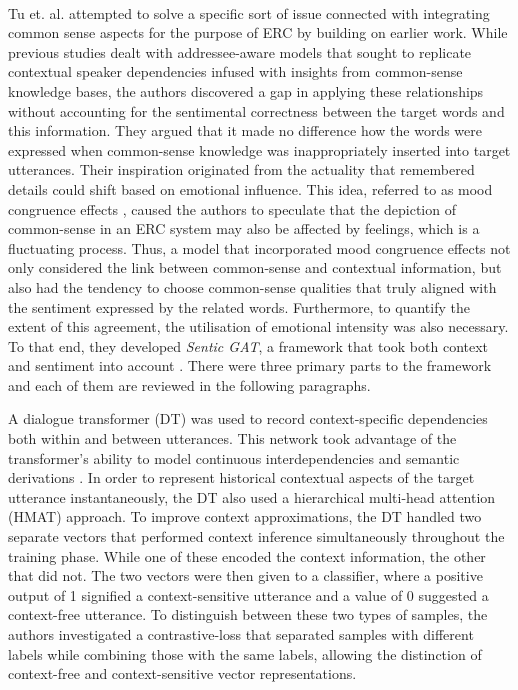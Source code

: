 \\
Tu et. al. attempted to solve a specific sort of issue connected with integrating common sense aspects for the purpose of ERC by building on earlier work. While previous studies dealt with addressee-aware models that sought to replicate contextual speaker dependencies infused with insights from common-sense knowledge bases, the authors discovered a gap in applying these relationships without accounting for the sentimental correctness between the target words and this information. They argued that it made no difference how the words were expressed when common-sense knowledge was inappropriately inserted into target utterances. Their inspiration originated from the actuality that remembered details could shift based on emotional influence. This idea, referred to as mood congruence effects \cite{Ekkekakis2013TheMO}, caused the authors to speculate that the depiction of common-sense in an ERC system may also be affected by feelings, which is a fluctuating process. Thus, a model that incorporated mood congruence effects not only considered the link between common-sense and contextual information, but also had the tendency to choose common-sense qualities that truly aligned with the sentiment expressed by the related words. Furthermore, to quantify the extent of this agreement, the utilisation of emotional intensity was also necessary. To that end, they developed \textit{Sentic GAT}, a framework that took both context and sentiment into account \cite{Tu2022ContextAS}. There were three primary parts to the framework and each of them are reviewed in the following paragraphs.

A dialogue transformer (DT) was used to record context-specific dependencies both within and between utterances. This network took advantage of the transformer's \cite{Vaswani2017AttentionIA} ability to model continuous interdependencies and semantic derivations \cite{Tang2018WhySA}. In order to represent historical contextual aspects of the target utterance instantaneously, the DT also used a hierarchical multi-head attention (HMAT) approach. To improve context approximations, the DT handled two separate vectors that performed context inference simultaneously throughout the training phase. While one of these encoded the context information, the other that did not. The two vectors were then given to a classifier, where a positive output of 1 signified a context-sensitive utterance and a value of 0 suggested a context-free utterance. To distinguish between these two types of samples, the authors investigated a contrastive-loss \cite{Gunel2020SupervisedCL, Khosla2020SupervisedCL} that separated samples with different labels while combining those with the same labels, allowing the distinction of context-free and context-sensitive vector representations.

